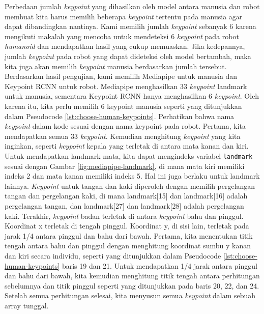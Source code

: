 Perbedaan jumlah \textit{keypoint} yang dihasilkan oleh model antara manusia dan robot membuat kita harus memilih beberapa \textit{keypoint} tertentu pada manusia agar dapat dibandingkan nantinya.
Kami memilih jumlah \textit{keypoint} sebanyak 6 karena mengikuti makalah \parencite{amini2021} yang mencoba untuk mendeteksi 6 \textit{keypoint} pada robot \textit{humanoid} dan mendapatkan hasil yang cukup memuaskan.
Jika kedepannya, jumlah \textit{keypoint} pada robot yang dapat dideteksi oleh model bertambah, maka kita juga akan memilih \textit{keypoint} manusia berdasarkan jumlah tersebut. 
Berdasarkan hasil pengujian, kami memilih Mediapipe untuk manusia dan Keypoint RCNN untuk robot. Mediapipe menghasilkan 33 \textit{keypoint} landmark untuk manusia, sementara Keypoint RCNN hanya menghasilkan 6 \textit{keypoint}.
Oleh karena itu, kita perlu memilih 6 keypoint manusia seperti yang ditunjukkan dalam Pseudocode \ref{lst:choose-human-keypoints}.
Perhatikan bahwa nama \textit{keypoint} dalam kode sesuai dengan nama keypoint pada robot. Pertama, kita mendapatkan semua 33 \textit{keypoint}. Kemudian menghitung \textit{keypoint} yang kita inginkan, seperti \textit{keypoint} kepala yang terletak di antara mata kanan dan kiri.
Untuk mendapatkan landmark mata, kita dapat mengindeks variabel \verb|landmark| sesuai dengan Gambar \ref{fig:mediapipe-landmark}, di mana mata kiri memiliki indeks 2 dan mata kanan memiliki indeks 5. Hal ini juga berlaku untuk landmark lainnya.
\textit{Keypoint} untuk tangan dan kaki diperoleh dengan memilih pergelangan tangan dan pergelangan kaki, di mana landmark[15] dan landmark[16] adalah pergelangan tangan, dan landmark[27] dan landmark[28] adalah pergelangan kaki.
Terakhir, \textit{keypoint} badan terletak di antara \textit{keypoint} bahu dan pinggul. Koordinat x terletak di tengah pinggul. Koordinat y, di sisi lain, terletak pada jarak 1/4 antara pinggul dan bahu dari bawah.
Pertama, kita menentukan titik tengah antara bahu dan pinggul dengan menghitung koordinat sumbu y kanan dan kiri secara individu, seperti yang ditunjukkan dalam Pseudocode \ref{lst:choose-human-keypoints} baris 19 dan 21. Untuk mendapatkan 1/4 jarak antara pinggul dan bahu dari bawah, kita kemudian menghitung titik tengah antara perhitungan sebelumnya dan titik pinggul seperti yang ditunjukkan pada baris 20, 22, dan 24.
Setelah semua perhitungan selesai, kita menyusun semua \textit{keypoint} dalam sebuah array tunggal.



